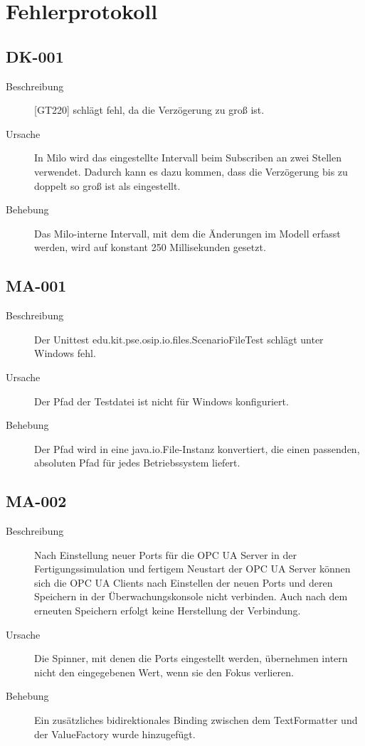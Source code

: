 \documentclass[parskip=full]{scrartcl}
\begin{document}
\section{Fehlerprotokoll}

\subsection{DK-001}
\begin{description}
	\item[Beschreibung] [GT220] schlägt fehl, da die Verzögerung zu groß ist.
	\item[Ursache] In Milo wird das eingestellte Intervall beim Subscriben an zwei Stellen verwendet. Dadurch kann es dazu kommen, dass die Verzögerung bis zu doppelt so groß ist als eingestellt.
	\item[Behebung] Das Milo-interne Intervall, mit dem die Änderungen im Modell erfasst werden, wird auf konstant 250 Millisekunden gesetzt.
\end{description}

\subsection{MA-001}
\begin{description}
	\item[Beschreibung] Der Unittest edu.kit.pse.osip.io.files.ScenarioFileTest schlägt unter Windows fehl.
	\item[Ursache] Der Pfad der Testdatei ist nicht für Windows konfiguriert.
	\item[Behebung] Der Pfad wird in eine java.io.File-Instanz konvertiert, die einen passenden, absoluten Pfad für jedes Betriebssystem liefert.
\end{description}

\subsection{MA-002}
\begin{description}
	\item[Beschreibung] Nach Einstellung neuer Ports für die OPC UA Server in der Fertigungssimulation und fertigem Neustart der OPC UA Server können sich die OPC UA Clients nach Einstellen der neuen Ports und deren Speichern in der Überwachungskonsole nicht verbinden. Auch nach dem erneuten Speichern erfolgt keine Herstellung der Verbindung.
	\item[Ursache] Die Spinner, mit denen die Ports eingestellt werden, übernehmen intern nicht den eingegebenen Wert, wenn sie den Fokus verlieren.
	\item[Behebung] Ein zusätzliches bidirektionales Binding zwischen dem TextFormatter und der ValueFactory wurde hinzugefügt.
\end{description}
\end{document}
